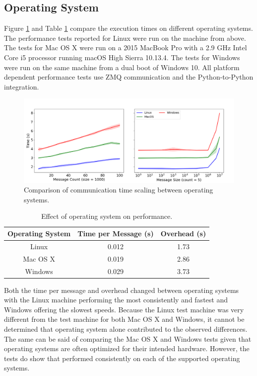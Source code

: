 \documentclass[journal]{IEEEtran}
\newcommand{\todo}[1]{{\color{red}{#1}}}
\newcommand{\pkg}{{\tt \todo{cis\_interface}}{}}
\begin{document}
\subsection{Operating System}\label{SS:results_platform}
%
Figure \ref{fig:platform} and Table \ref{tab:platform} compare the execution times on different operating systems. The performance tests reported for Linux were run on the machine from above. The tests for Mac OS X were run on a 2015 MacBook Pro with a 2.9 GHz Intel Core i5 processor running macOS High Sierra 10.13.4. The tests for Windows were run on the same machine from a dual boot of Windows 10. All platform dependent performance tests use ZMQ communication and the Python-to-Python integration.
%
\ifinclfig
 	\begin{figure}[htbp]
	\begin{center}
	\includegraphics[width=\columnwidth,keepaspectratio]{./images/scaling_platform.png}
	\caption{Comparison of communication time scaling between operating systems.}
	\label{fig:platform}
	\end{center}
	\end{figure}
\fi
%
\begin{table}[htbp]
\begin{center}
\begin{tabular}{|c|c|c|}
\hline
Operating System	& Time per Message (s) 	& Overhead (s) 	\\\hline
Linux			& 0.012				& 1.73			\\
Mac OS X			& 0.019				& 2.86			\\
Windows			& 0.029				& 3.73			\\\hline
\end{tabular}
\end{center}
\caption{Effect of operating system on performance.}
\label{tab:platform}
\end{table}%
%
Both the time per message and overhead changed between operating systems with the Linux machine performing the most consistently and fastest and Windows offering the slowest speeds. Because the Linux test machine was very different from the test machine for both Mac OS X and Windows, it cannot be determined that operating system alone contributed to the observed differences. The same can be said of comparing the Mac OS X and Windows tests given that operating systems are often optimized for their intended hardware. However, the tests do show that {\pkg} performed consistently on each of the supported operating systems.
\end{document}
